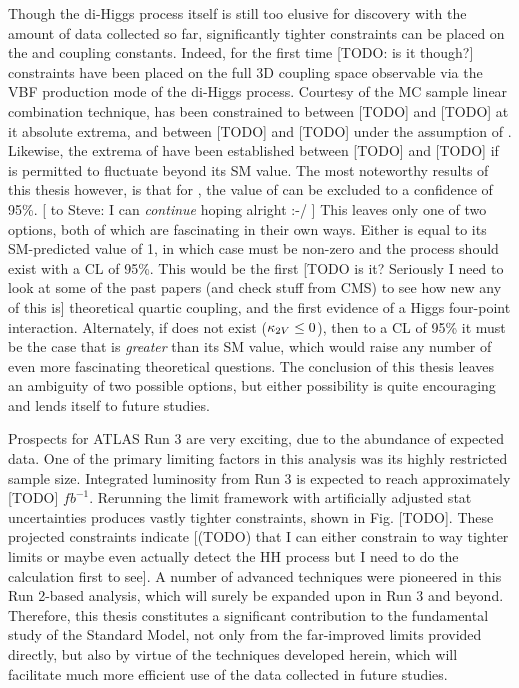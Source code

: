 Though the di-Higgs process itself is still too elusive for discovery with the amount of data collected so far,
    significantly tighter constraints can be placed on the \kvv and \kl coupling constants.
Indeed, for the first time [TODO: is it though?] constraints have been placed on the full
    3D coupling space observable via the VBF production mode of the di-Higgs process.
Courtesy of the MC sample linear combination technique,
    \kl has been constrained to between [TODO] and [TODO] at it absolute extrema,
    and between [TODO] and [TODO] under the assumption of .
Likewise, the extrema of \kvv have been established between [TODO] and [TODO] if \kl is permitted to fluctuate beyond its SM value.
The most noteworthy results of this thesis however, is that for ,
    the value of  can be excluded to a confidence of 95\%. [ to Steve: I can \textit{continue} hoping alright :-/ ]
This leaves only one of two options, both of which are fascinating in their own ways.
Either \kl is equal to its SM-predicted value of 1,
    in which case \kvv must be non-zero and the \HHVV process should exist with a CL of 95\%.
This would be the first
    [TODO is it? Seriously I need to look at some of the past papers (and check stuff from CMS) to see how new any of this is]
    theoretical quartic coupling,
    and the first evidence of a Higgs four-point interaction.
Alternately, if \kvv does not exist ($\kappa_{2V} \leq 0$), then to a CL of 95\% it must be the case
    that \kl is \textit{greater} than its SM value, which would raise any number of even more fascinating theoretical questions.
The conclusion of this thesis leaves an ambiguity of two possible options,
    but either possibility is quite encouraging and lends itself to future studies.

Prospects for ATLAS Run 3 are very exciting, due to the abundance of expected data.
One of the primary limiting factors in this analysis was its highly restricted sample size.
Integrated luminosity from Run 3 is expected to reach approximately [TODO] $\textit{fb}^{-1}$.
Rerunning the limit framework with artificially adjusted stat uncertainties produces vastly tighter constraints,
    shown in Fig. [TODO].
These projected constraints indicate [(TODO) that I can either constrain to way tighter limits or maybe even actually detect the HH process
    but I need to do the calculation first to see].
A number of advanced techniques were pioneered in this Run 2-based analysis,
    which will surely be expanded upon in Run 3 and beyond.
Therefore, this thesis constitutes a significant contribution to the fundamental study of the Standard Model,
    not only from the far-improved limits provided directly,
    but also by virtue of the techniques developed herein,
    which will facilitate much more efficient use of the data collected in future studies.


